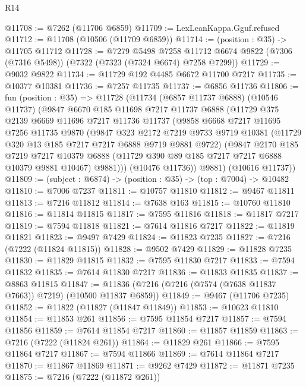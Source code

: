 \begin{lexlean}{R14}
\begin{coremodule}
@11708 := @7262 (@11706 @6859)
@11709 := LexLeanKappa.Gguf.refused
@11712 := @11708 (@10506 (@11709 @6859))
@11714 := (position : @35) -> @11705 @11712
@11728 := @7279
    @5498
    @7258
    @11712
    @6674
    @9822
    (@7306 (@7316 @5498))
    (@7322 (@7323 (@7324 @6674) @7258 @7299))
@11729 := @9032 @9822
@11734 := @11729 @192 @4485 @6672 @11700 @7217
@11735 := @10377 @10381
@11736 := @7257 @11735
@11737 := @6856 @11736
@11806 := fun (position : @35) =>
  @11728
    (@11734
      (@6857 @11737 @6888)
      (@10546 @11737)
      (@9847
        @6670
        @185
        @11698
        @7217
        @11737
        @6888
        (@11729
          @375
          @2139
          @6669
          @11696
          @7217
          @11736
          @11737
          (@9858
            @6668
            @7217
            @11695
            @7256
            @11735
            @9870
            (@9847
              @323
              @2172
              @7219
              @9733
              @9719
              @10381
              (@11729 @320 @13 @185 @7217 @7217 @6888 @9719 @9881 @9722)
              (@9847
                @2170
                @185
                @7219
                @7217
                @10379
                @6888
                (@11729 @390 @89 @185 @7217 @7217 @6888 @10379 @9881 @10467)
                @9881)))
          (@10476 @11736))
        @9881)
      (@10616 @11737))
@11809 := (subject : @6874) -> (position : @35) -> (top : @7004) -> @10482
@11810 := @7006 @7237
@11811 := @10757 @11810
@11812 := @9467 @11811
@11813 := @7216 @11812
@11814 := @7638 @163
@11815 := @10760 @11810
@11816 := @11814 @11815
@11817 := @7595 @11816
@11818 := @11817 @7217
@11819 := @7594 @11818
@11821 := @7614 @11816 @7217
@11822 := @11819 @11821
@11823 := @9497 @7429
@11824 := @11823 @7235
@11827 := @7216 (@7222 (@11824 @11815))
@11828 := @9502 @7429
@11829 := @11828 @7235
@11830 := @11829 @11815
@11832 := @7595 @11830 @7217
@11833 := @7594 @11832
@11835 := @7614 @11830 @7217
@11836 := @11833 @11835
@11837 := @8863 @11815
@11847 := @11836 (@7216 (@7216 (@7574 (@7638 @11837 @7663)) @7219) (@10500 @11837 @6859))
@11849 := @9467 (@11706 @7235)
@11852 := @11822 (@11827 (@11847 @11849))
@11853 := @10623 @11810
@11854 := @11853 @261
@11856 := @7595 @11854 @7217
@11857 := @7594 @11856
@11859 := @7614 @11854 @7217
@11860 := @11857 @11859
@11863 := @7216 (@7222 (@11824 @261))
@11864 := @11829 @261
@11866 := @7595 @11864 @7217
@11867 := @7594 @11866
@11869 := @7614 @11864 @7217
@11870 := @11867 @11869
@11871 := @9262 @7429
@11872 := @11871 @7235
@11875 := @7216 (@7222 (@11872 @261))

\end{coremodule}
\end{lexlean}

